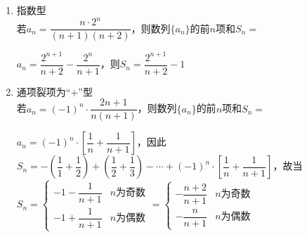 \begin{enumerate}
\begin{enumerate}
\begin{jieda}
\begin{enumerate}
                当$n \geq  3,n \in  \mathbf{Z}$时，$2{T}_{n} - \sqrt{{a}_{n}} = \sqrt{{2n} + 3} - 1 - \sqrt{3} \geq  2 - \sqrt{3} > 0 $，因此$4{T}_{n}^{2} > {a}_{n} $
            \end{enumerate}
        \end{jieda}
        \item 指数型 \\
        若$a_n = \dfrac{n\cdot2^n}{(n+1)(n+2)}$，则数列$\{a_n\}$的前$n$项和$S_n = $
        \begin{jieda}
            $a_n = \dfrac{2^{n+1}}{n+2} - \dfrac{2^n}{n+1}$，则$S_n = \dfrac{2^{n+1}}{n+2} - 1$
        \end{jieda}
        \item 通项裂项为“+”型 \\
        若$a_n = (-1)^n \cdot \dfrac{2n+1}{n(n+1)}$，则数列$\{a_n\}$的前$n$项和$S_n = $
        \begin{jieda}
            $a_n = (-1)^n \cdot \left [\dfrac{1}{n} + \dfrac{1}{n+1}\right]$，因此$S_n = -\left(\dfrac{1}{1} + \dfrac{1}{2}\right) + \left(\dfrac{1}{2} + \dfrac{1}{3}\right) - \cdots + (-1)^n \cdot \left [\dfrac{1}{n} + \dfrac{1}{n+1}\right]$，故当$S_n = \left \{ \begin{array}{ll}
                 -1 - \dfrac{1}{n+1} & n\mbox{为奇数} \\
                 -1 + \dfrac{1}{n+1} & n\mbox{为偶数}
            \end{array}\right. = 
            \left \{ \begin{array}{ll}
                 - \dfrac{n+2}{n+1} & n\mbox{为奇数} \\
                 - \dfrac{n}{n+1} & n\mbox{为偶数}
            \end{array}\right. $ 
        \end{jieda}
    \end{enumerate}
\end{enumerate}